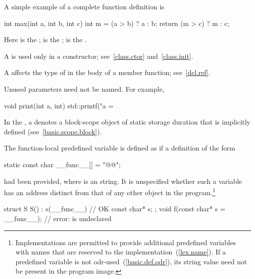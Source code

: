 \pnum
\begin{example}
A simple example of a complete function definition is

%
\begin{codeblock}
int max(int a, int b, int c) {
  int m = (a > b) ? a : b;
  return (m > c) ? m : c;
}
\end{codeblock}

Here
is the
;
is the
;
is the
.
\end{example}

\pnum
{}%
%
%
A
is used only in a constructor; see~\ref{class.ctor} and~\ref{class.init}.

\pnum
\begin{note}
A  affects the type of 
in the body of a member function; see~\ref{dcl.ref}.
\end{note}

\pnum
\begin{note}
Unused parameters need not be named.
For example,

%
\begin{codeblock}
void print(int a, int) {
  std::printf("a = %
}
\end{codeblock}
\end{note}

\pnum
In the , a
 denotes a block-scope object of static
storage duration that is implicitly defined (see~\ref{basic.scope.block}).

\pnum
The function-local predefined variable  is
defined as if a definition of the form
\begin{codeblock}
static const char __func__[] = "@@";
\end{codeblock}
had been provided, where  is an  string.
It is unspecified whether such a variable has an address
distinct from that of any other object in the program.\footnote{Implementations are
permitted to provide additional predefined variables with names that are reserved to the
implementation~(\ref{lex.name}). If a predefined variable is not
odr-used~(\ref{basic.def.odr}), its string value need not be present in the program image.}
\begin{example}
\begin{codeblock}
struct S {
  S() : s(__func__) { }             // OK
  const char* s;
};
void f(const char* s = __func__);   // error:  is undeclared
\end{codeblock}
\end{example}

